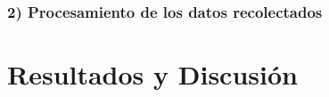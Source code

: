 \documentclass[letterpaper,9pt,twocolumn,twoside,]{pinp}
\begin{document}
\hypertarget{procesamiento-de-los-datos-recolectados}{%
\subsubsection{2) Procesamiento de los datos
recolectados}\label{procesamiento-de-los-datos-recolectados}}

\hypertarget{resultados-y-discusiuxf3n}{%
\section{Resultados y Discusión}\label{resultados-y-discusiuxf3n}}



\renewcommand\refname{Conclusiones}


\end{document}
